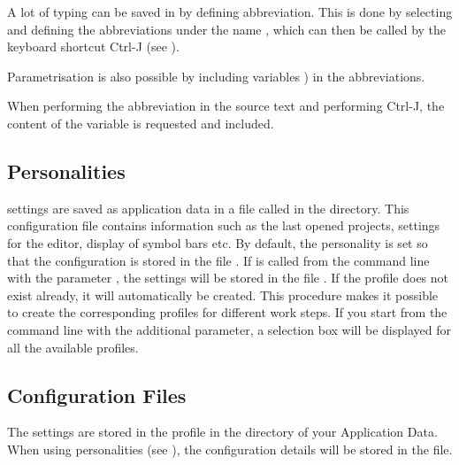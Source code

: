 A lot of typing can be saved in \codeblocks by defining abbreviation. This is done by selecting  and defining the abbreviations under the name , which can then be called by the keyboard shortcut Ctrl-J (see ).


Parametrisation is also possible by including variables ) in the abbreviations.


When performing the abbreviation  in the source text and performing Ctrl-J, the content of the variable is requested and included.

\subsection{Personalities}\label{sec:personalities}

\codeblocks settings are saved as application data in a file called  in the  directory. This configuration file contains information such as the last opened projects, settings for the editor, display of symbol bars etc. By default, the  personality is set so that the configuration is stored in the file . If \codeblocks is called from the command line with the parameter , the settings will be stored in the file . If the profile does not exist already, it will automatically be created. This procedure makes it possible to create the corresponding profiles for different work steps. If you start \codeblocks from the command line with the additional parameter, a selection box will be displayed for all the available profiles.


\subsection{Configuration Files}

The \codeblocks settings are stored in the  profile in the  directory of your Application Data. When using personalities (see ), the configuration details will be stored in the  file.

